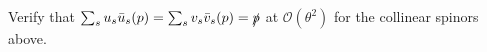 \begin{subappendices}
\begin{exercise}
    Verify that \(\sum_s u_s \bar{u}_s (p) = \sum_s v_s \bar{v}_s (p) = \slashed{p}\) at \(\mathcal{O}(\theta^2)\) for the collinear spinors above.


\end{exercise}
\end{subappendices}
